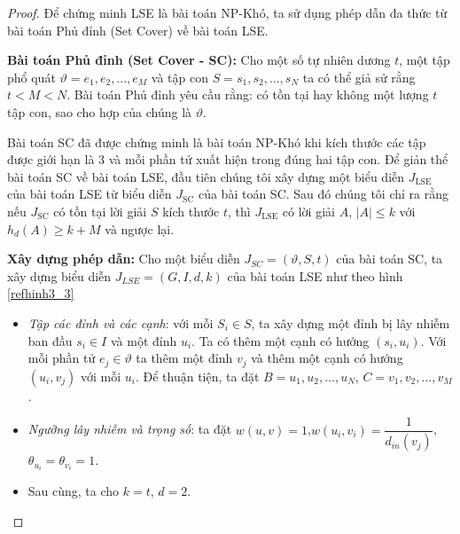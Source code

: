 \begin{proof}
	Để chứng minh LSE là bài toán NP-Khó, ta sử dụng phép dẫn đa thức từ bài toán Phủ đỉnh (Set Cover) về bài toán LSE. 
	
	{\bfseries Bài toán Phủ đỉnh (Set Cover - SC):} Cho một số tự nhiên dương $t$, một tập phổ quát $\vartheta = {e_{1}, e_{2}, ... ,e_{M}}$ và tập con $S = {s_{1}, s_{2}, ... , s_{N}}$ ta có thể giả sử rằng $t < M < N$. Bài toán Phủ đỉnh yêu cầu rằng: có tồn tại hay không một lượng $t$ tập con, sao cho hợp của chúng là $\vartheta$.
	
	Bài toán SC đã được chứng minh là bài toán NP-Khó khi kích thước các tập được giới hạn là 3 và mỗi phần tử xuất hiện trong đúng hai tập con. Để giản thể bài toán SC về bài toán LSE, đầu tiên chúng tôi xây dựng một biểu diễn $J_{\text{LSE}}$ của bài toán LSE từ biểu diễn $J_{\text{SC}}$ của bài toán SC. Sau đó chúng tôi chỉ ra rằng nếu $J_{\text{SC}}$ có tồn tại lời giải $S$ kích thước $t$, thì $J_{\text{LSE}}$ có lời giải $A$, $| A | \leq k$ với $h_{d}(A) \geq k + M$ và ngược lại.
	
	{\bfseries Xây dựng phép dẫn:} Cho một biểu diễn $J_{SC} = (\vartheta, S, t)$ của bài toán SC, ta xây dựng biểu diễn $J_{LSE} = (G, I, d, k)$ của bài toán LSE như theo hình \ref{refhinh3_3}
	\begin {itemize}
	\item {\itshape Tập các đỉnh và các cạnh}: với mỗi $S_{i} \in S$, ta xây dựng một đỉnh bị lây nhiễm ban đầu $s_{i} \in I$ và một đỉnh $u_{i}$. Ta có thêm một cạnh có hướng $(s_{i}, u_{i})$. Với mỗi phần tử $e_{j} \in \vartheta$ ta thêm một đỉnh $v_{j}$ và thêm một cạnh có hướng $(u_{i},v_{j})$ với mỗi $u_{i}$. Để thuận tiện, ta đặt $B = {u_{1}, u_{2}, ... , u_{N}}$, $C = {v_{1}, v_{2}, ... , v_{M}}$.
	
	\item {\itshape Ngưỡng lây nhiễm và trọng số}: ta đặt $w(u,v) = 1$,\linebreak $w(u_{i}, v_{i}) = \dfrac{1}{d_{in}(v_{j})}$, $\theta_{u_{i}} = \theta_{v_{i}} = 1$.
	
	\item Sau cùng, ta cho $k = t$, $d = 2$. 		
	

\end{itemize}
\end{proof}
